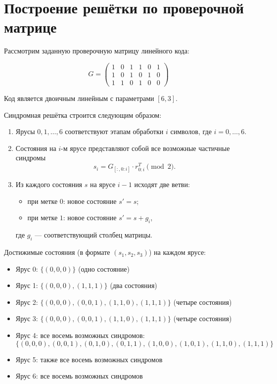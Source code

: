 \documentclass[a4paper,12pt]{article}
\begin{document}
\section{Построение решётки по проверочной матрице}

Рассмотрим заданную проверочную матрицу линейного кода:

\[
G =
\begin{pmatrix}
1 & 0 & 1 & 1 & 0 & 1 \\
1 & 0 & 1 & 0 & 1 & 0 \\
1 & 1 & 0 & 1 & 0 & 0
\end{pmatrix}
\]

Код является двоичным линейным с параметрами $[6, 3]$.

Синдромная решётка строится следующим образом:

\begin{enumerate}
    \item Ярусы $0, 1, \dots, 6$ соответствуют этапам обработки $i$ символов, где $i = 0, \dots, 6$.
    
    \item Состояния на $i$-м ярусе представляют собой все возможные частичные синдромы
    \[
    s_i = G_{[:, 0:i]} \cdot r_{0:i}^T \pmod{2}.
    \]
    
    \item Из каждого состояния $s$ на ярусе $i-1$ исходят две ветви:
    \begin{itemize}
        \item при метке $0$: новое состояние $s' = s$;
        \item при метке $1$: новое состояние $s' = s + g_i$,
    \end{itemize}
    где $g_i$ — соответствующий столбец матрицы.
\end{enumerate}

Достижимые состояния (в формате $(s_1, s_2, s_3)$) на каждом ярусе:

\begin{itemize}
    \item Ярус 0: $\{(0,0,0)\}$ (одно состояние)
    
    \item Ярус 1: $\{(0,0,0), (1,1,1)\}$ (два состояния)
    
    \item Ярус 2: $\{(0,0,0), (0,0,1), (1,1,0), (1,1,1)\}$ (четыре состояния)
    
    \item Ярус 3: $\{(0,0,0), (0,0,1), (1,1,0), (1,1,1)\}$ (четыре состояния)
    
    \item Ярус 4: все восемь возможных синдромов:
    \[
    \{(0,0,0), (0,0,1), (0,1,0), (0,1,1), (1,0,0), (1,0,1), (1,1,0), (1,1,1)\}
    \]
    
    \item Ярус 5: также все восемь возможных синдромов
    
    \item Ярус 6: все восемь возможных синдромов
\end{itemize}
\end{document}
